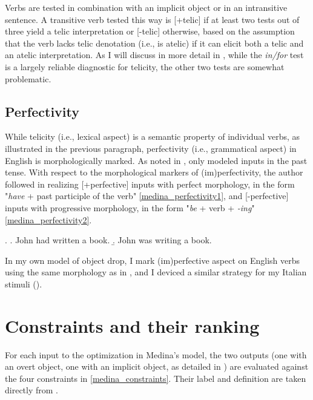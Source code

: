 Verbs are tested in combination with an implicit object or in an intransitive sentence. A transitive verb tested this way is [+telic] if at least two tests out of three yield a telic interpretation or [-telic] otherwise, based on the assumption that the verb lacks telic denotation (i.e., is atelic) if it can elicit both a telic and an atelic interpretation. As I will discuss in more detail in , while the \textit{in/for} test is a largely reliable diagnostic for telicity, the other two tests are somewhat problematic.


\subsection{Perfectivity} While telicity (i.e., lexical aspect) is a semantic property of individual verbs, as illustrated in the previous paragraph, perfectivity (i.e., grammatical aspect) in English is morphologically marked. As noted in , \textcite{Medina2007} only modeled inputs in the past tense. With respect to the morphological markers of (im)perfectivity, the author followed \textcite{Olsen1997} in realizing [+perfective] inputs with perfect morphology, in the form "\textit{have} + past participle of the verb" \ref{medina_perfectivity1}, and [-perfective] inputs with progressive morphology, in the form "\textit{be} + verb + \textit{-ing}" \ref{medina_perfectivity2}.

\ex. \label{medina_perfectivity} \a. \label{medina_perfectivity1} John had written a book.
\b. \label{medina_perfectivity2}  John was writing a book.

In my own model of object drop, I mark (im)perfective aspect on English verbs using the same morphology as in \textcite{Medina2007}, and I deviced a similar strategy for my Italian stimuli ().


\section{Constraints and their ranking} 

For each input to the optimization in Medina's model, the two outputs (one with an overt object, one with an implicit object, as detailed in ) are evaluated against the four constraints in \ref{medina_constraints}. Their label and definition are taken directly from \textcite[72]{Medina2007}.



